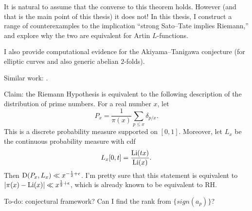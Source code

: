 It is natural to assume that the converse to this theorem holds. However (and 
that is the main point of this thesis) it does not! In this thesis, I construct 
a range of counterexamples to the implication ``strong Sato--Tate implies 
Riemann,'' and explore why the two are equivalent for Artin $L$-functions. 

I also provide computational evidence for the Akiyama--Tanigawa conjecture 
(for elliptic curves and also generic abelian $2$-folds). 

Similar work: \cite{pande-2011}. 


Claim: the Riemann Hypothesis is equivalent to the following description of the 
distribution of prime numbers. For a real number $x$, let 
\[
	P_x = \frac{1}{\pi(x)} \sum_{p\leqslant x} \delta_{p/x} .
\]
This is a discrete probability measure supported on $[0,1]$. Moreover, let 
$L_x$ be the continuous probability measure with cdf 
\[
	L_x[0,t] = \frac{\operatorname{Li}(tx)}{\operatorname{Li}(x)} .
\]
Then $\operatorname{D}(P_x,L_x) \ll x^{-\frac 1 2+\epsilon}$. I'm pretty sure that this 
statement is equivalent to $|\pi(x)-\operatorname{Li}(x)| \ll x^{\frac 1 2+\epsilon}$, which 
is already known to be equivalent to RH. 

To-do: conjectural framework? Can I find the rank from $\{sign(a_p)\}$?

